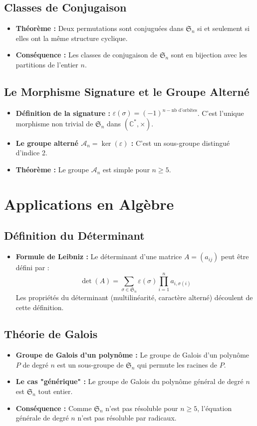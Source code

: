 \documentclass[12pt, a4paper, parskip=full]{report}
\theoremstyle{agregstyle}
\begin{document}
\subsection{Classes de Conjugaison}
\begin{itemize}
    \item \textbf{Théorème :} Deux permutations sont conjuguées dans $\mathfrak{S}_n$ si et seulement si elles ont la même structure cyclique.
    \item \textbf{Conséquence :} Les classes de conjugaison de $\mathfrak{S}_n$ sont en bijection avec les partitions de l'entier $n$.
\end{itemize}
\subsection{Le Morphisme Signature et le Groupe Alterné}
\begin{itemize}
    \item \textbf{Définition de la signature :} $\varepsilon(\sigma) = (-1)^{n - \text{nb d'orbites}}$. C'est l'unique morphisme non trivial de $\mathfrak{S}_n$ dans $(\mathbb{C}^*, \times)$.
    \item \textbf{Le groupe alterné $\mathcal{A}_n = \ker(\varepsilon)$ :} C'est un sous-groupe distingué d'indice 2.
    \item \textbf{Théorème :} Le groupe $\mathcal{A}_n$ est simple pour $n \ge 5$.
\end{itemize}

\section{Applications en Algèbre}
\subsection{Définition du Déterminant}
\begin{itemize}
    \item \textbf{Formule de Leibniz :} Le déterminant d'une matrice $A=(a_{ij})$ peut être défini par :
    $$ \det(A) = \sum_{\sigma \in \mathfrak{S}_n} \varepsilon(\sigma) \prod_{i=1}^n a_{i, \sigma(i)} $$
    Les propriétés du déterminant (multilinéarité, caractère alterné) découlent de cette définition.
\end{itemize}
\subsection{Théorie de Galois}
\begin{itemize}
    \item \textbf{Groupe de Galois d'un polynôme :} Le groupe de Galois d'un polynôme $P$ de degré $n$ est un sous-groupe de $\mathfrak{S}_n$ qui permute les racines de $P$.
    \item \textbf{Le cas "générique" :} Le groupe de Galois du polynôme général de degré $n$ est $\mathfrak{S}_n$ tout entier.
    \item \textbf{Conséquence :} Comme $\mathfrak{S}_n$ n'est pas résoluble pour $n \ge 5$, l'équation générale de degré $n$ n'est pas résoluble par radicaux.
\end{itemize}
\end{document}
